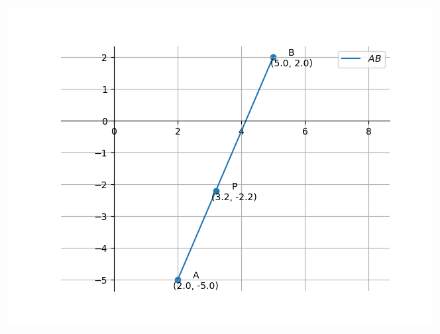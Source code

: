 \documentclass[journal]{article}
\begin{document}
\begin{figure}
    \centering
    \includegraphics[width=1.0\linewidth]{figs/fig_2.png}
    \caption{}
    \label{fig:placeholder}
\end{figure}
\end{document}
